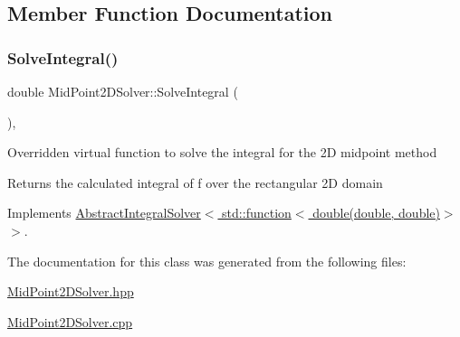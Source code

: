 \subsection{Member Function Documentation}
\mbox{\label{class_mid_point2_d_solver_a45c6c6802b7d40c35f1f60f1a39f5042}} 
\subsubsection{\texorpdfstring{Solve\+Integral()}{SolveIntegral()}}
{\footnotesize\ttfamily double Mid\+Point2\+D\+Solver\+::\+Solve\+Integral (\begin{DoxyParamCaption}{ }\end{DoxyParamCaption})\hspace{0.3cm}{\ttfamily [override]}, {\ttfamily [virtual]}}

Overridden virtual function to solve the integral for the 2D midpoint method \begin{DoxyReturn}{Returns}
the calculated integral of f over the rectangular 2D domain 
\end{DoxyReturn}


Implements \hyperlink{class_abstract_integral_solver_ad87cb44c5ef3122bc95be48f473ba399}{Abstract\+Integral\+Solver$<$ std\+::function$<$ double(double, double)$>$ $>$}.



The documentation for this class was generated from the following files\+:\begin{DoxyCompactItemize}
\item 
\hyperlink{_mid_point2_d_solver_8hpp}{Mid\+Point2\+D\+Solver.\+hpp}\item 
\hyperlink{_mid_point2_d_solver_8cpp}{Mid\+Point2\+D\+Solver.\+cpp}\end{DoxyCompactItemize}

